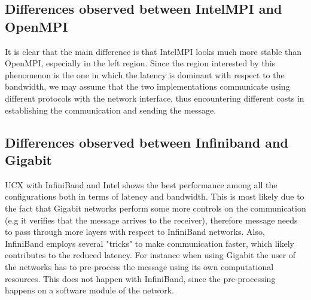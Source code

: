 \documentclass[11pt,a4paper]{article}
\begin{document}
\subsection{Differences observed between IntelMPI and OpenMPI}
It is clear that the main difference is that IntelMPI looks much more stable than OpenMPI, especially in the left region. Since the region interested by this phenomenon is the one in which the latency is dominant with respect to the bandwidth, we may assume that the two implementations communicate using different protocols with the network interface, thus encountering different costs in establishing the communication and sending the message. 
\subsection{Differences observed between Infiniband and Gigabit}
UCX with InfiniBand and Intel shows the best performance among all the configurations both in terms of latency and bandwidth. This is most likely due to the fact that Gigabit networks perform some more controls on the communication (e.g it verifies that the message arrives to the receiver), therefore message needs to pass through more layers with respect to InfiniBand networks. Also, InfiniBand employs several "tricks" to make communication faster, which likely contributes to the reduced latency. For instance when using Gigabit the user of the networks has to pre-process the message using its own computational resources. This does not happen with InfiniBand, since the pre-processing happens on a software module of the network.  
\end{document}

